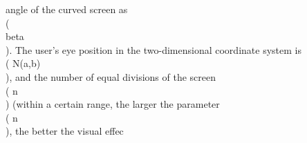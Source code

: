 angle of the curved screen as \\( \\beta \\). The user's eye position in the two-dimensional coordinate system is \\( N(a,b) \\), and the number of equal divisions of the screen \\( n \\) (within a certain range, the larger the parameter \\( n \\), the better the visual effec
